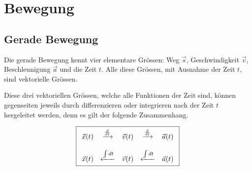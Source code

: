 



\chapter{Bewegung}

\section{Gerade Bewegung}
Die gerade Bewegung kennt vier elementare Grössen: 
Weg $\vec{s}$, Geschwindigkeit $\vec{v}$, Beschleunigung $\vec{a}$ und
die Zeit $t$. Alle diese Grössen, mit Ausnahme der Zeit $t$, sind 
vektorielle Grössen.

Diese drei vektoriellen Grössen, welche alle Funktionen der Zeit
sind, können gegenseiten jeweils durch differenzieren oder integrieren 
nach der Zeit $t$ hergeleitet werden, denn es gilt der folgende 
Zusammenhang.

\[ \boxed{\begin{array}{c c c c c}
	\vec{x}(t) 
		& \xrightarrow{\frac{d}{dt}}
	& \vec{v}(t)
		& \xrightarrow{\frac{d}{dt}}
	& \vec{a}(t) \\
	& & & & \\
	\vec{x}(t) 
		& \xleftarrow{\int dt}
	& \vec{v}(t)
		& \xleftarrow{\int dt}
	& \vec{a}(t) \\
\end{array}} \]

